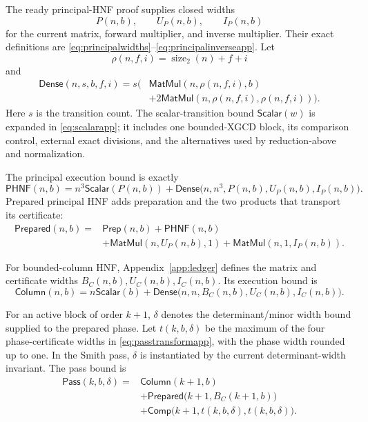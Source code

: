 \documentclass[11pt]{article}
\theoremstyle{definition}
\newcommand{\natsize}{\operatorname{size}_2}
\begin{document}
The ready principal-HNF proof supplies closed widths
\[
 P(n,b),\qquad U_P(n,b),\qquad I_P(n,b)
\]
for the current matrix, forward multiplier, and inverse multiplier.  Their exact definitions are \eqref{eq:principalwidths}--\eqref{eq:principalinverseapp}.  Let
\begin{equation}
 \rho(n,f,i)=\natsize(n)+f+i
 \label{eq:transformwidth}
\end{equation}
and
\begin{equation}
\begin{split}
 \mathsf{Dense}(n,s,b,f,i)=s\bigl(&\mathsf{MatMul}(n,\rho(n,f,i),b)\\
  &+2\mathsf{MatMul}(n,\rho(n,f,i),\rho(n,f,i))\bigr).
\end{split}
\label{eq:densereplay}
\end{equation}
Here $s$ is the transition count.  The scalar-transition bound $\mathsf{Scalar}(w)$ is expanded in \eqref{eq:scalarapp}; it includes one bounded-XGCD block, its comparison control, external exact divisions, and the alternatives used by reduction-above and normalization.

The principal execution bound is exactly
\begin{equation}
 \mathsf{PHNF}(n,b)=n^3\mathsf{Scalar}(P(n,b))+
  \mathsf{Dense}\bigl(n,n^3,P(n,b),U_P(n,b),I_P(n,b)\bigr).
 \label{eq:phnf}
\end{equation}
Prepared principal HNF adds preparation and the two products that transport its certificate:
\begin{equation}
\begin{split}
 \mathsf{Prepared}(n,b)={}&\mathsf{Prep}(n,b)+\mathsf{PHNF}(n,b)\\
 &+\mathsf{MatMul}(n,U_P(n,b),1)
  +\mathsf{MatMul}(n,1,I_P(n,b)).
\end{split}
\label{eq:preparedprincipal}
\end{equation}

For bounded-column HNF, Appendix~\ref{app:ledger} defines the matrix and certificate widths
$B_C(n,b),U_C(n,b),I_C(n,b)$.  Its execution bound is
\begin{equation}
 \mathsf{Column}(n,b)=n\mathsf{Scalar}(b)+
   \mathsf{Dense}\bigl(n,n,B_C(n,b),U_C(n,b),I_C(n,b)\bigr).
 \label{eq:columnbound}
\end{equation}

For an active block of order $k+1$, $\delta$ denotes the determinant/minor width bound supplied to the prepared phase.  Let $t(k,b,\delta)$ be the maximum of the four phase-certificate widths in \eqref{eq:passtransformapp}, with the phase width rounded up to one.  In the Smith pass, $\delta$ is instantiated by the current determinant-width invariant.  The pass bound is
\begin{equation}
\begin{split}
 \mathsf{Pass}(k,b,\delta)={}&
   \mathsf{Column}(k+1,b)\\
 &+\mathsf{Prepared}\bigl(k+1,B_C(k+1,b)\bigr)\\
 &+\mathsf{Comp}\bigl(k+1,t(k,b,\delta),t(k,b,\delta)\bigr).
\end{split}
\label{eq:passbound}
\end{equation}
\end{document}
